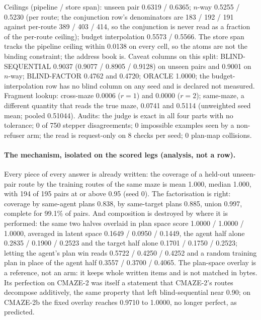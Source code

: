\documentclass{article} %
\begin{document}
\noindent Ceilings (pipeline / store span): unseen pair 0.6319 / 0.6365; $n$-way 0.5255 / 0.5230
(per route; the conjunction row's denominators are 183 / 192 / 191 against per-route 389 / 403 /
414, so the conjunction is never read as a fraction of the per-route ceiling); budget interpolation
0.5573 / 0.5566. The store span tracks the pipeline ceiling within 0.0138 on every cell, so the
atoms are not the binding constraint; the address book is. Caveat columns on this split:
BLIND-SEQUENTIAL 0.9037 (0.9077 / 0.8905 / 0.9128) on unseen pairs and 0.9001 on $n$-way;
BLIND-FACTOR 0.4762 and 0.4720; ORACLE 1.0000; the budget-interpolation row has no blind column on
any seed and is declared not measured. Fragment lookup: cross-maze 0.0006 ($r=1$) and 0.0000
($r=2$); same-maze, a different quantity that reads the true maze, 0.0741 and 0.5114 (unweighted
seed mean; pooled 0.51044). %
Audits: the judge is exact in all four parts with no tolerance; 0 of 750 stepper disagreements; 0
impossible examples seen by a non-refuser arm; the read is request-only on 8 checks per seed; 0
plan-map collisions. %

\paragraph{The mechanism, isolated on the scored legs (analysis, not a row).} Every piece of every
answer is already written: the coverage of a held-out unseen-pair route by the training routes of
the same maze is mean 1.000, median 1.000, with 194 of 195 pairs at or above 0.95 (seed 0). The
factorisation is right: coverage by same-agent plans 0.838, by same-target plans 0.885, union
0.997, complete for 99.1\% of pairs. And composition is destroyed by where it is performed: the
same two halves overlaid in plan space score 1.0000 / 1.0000 / 1.0000, averaged in latent space
0.1649 / 0.0950 / 0.1449, the agent half alone 0.2835 / 0.1900 / 0.2523 and the target half alone
0.1701 / 0.1750 / 0.2523; letting the agent's plan win reads 0.5722 / 0.4250 / 0.4252 and a random
training plan in place of the agent half 0.3557 / 0.3700 / 0.4065. %
The plan-space overlay is a reference, not an arm: it keeps whole written items and is not matched
in bytes. Its perfection on CMAZE-2 was itself a statement that CMAZE-2's routes decompose
additively, the same property that left blind-sequential near 0.90; on CMAZE-2b the fixed overlay
reaches 0.9710 to 1.0000, no longer perfect, as predicted. %
\end{document}
